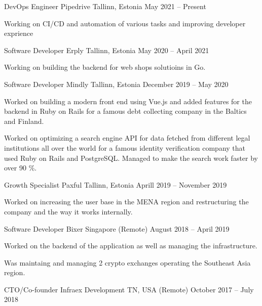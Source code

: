 \documentclass[]{awesome-cv}
\begin{document}
\vspace{-7mm}
\begin{cventries}
        \cventry
       {DevOps Engineer}
        {Pipedrive}
        {Tallinn, Estonia}
        {May 2021 – Present}
        {\begin{cvitems}
                \item {Working on CI/CD and automation of various tasks and improving developer exprience}
                \end{cvitems}}
	\cventry
	{Software Developer}
	{Erply}
	{Tallinn, Estonia}
	{May 2020 – April 2021}
	{\begin{cvitems}
		\item {Working on building the backend for web shops solutioins in Go.}
		\end{cvitems}}
	\cventry
	{Software Developer}
	{Mindly}
	{Tallinn, Estonia}
	{December 2019 – May 2020}
	{\begin{cvitems}
		\item {Worked on building a modern front end using Vue.js and added features for the backend in Ruby on Rails for a famous debt collecting company in the Baltics and Finland.}
		\item {Worked on optimizing a search engine API for data fetched from different legal institutions all over the world for a famous identity verification company that used Ruby on Rails and PostgreSQL. Managed to make the search work faster by over 90 \%.}
		\end{cvitems}}
	\cventry
	{Growth Specialist}
	{Paxful}
	{Tallinn, Estonia}
	{Aprill 2019 – November 2019}
	{\begin{cvitems}
		\item {Worked on increasing the user base in the MENA region and restructuring the company and the way it works internally.}
		\end{cvitems}}
	\cventry
	{Software Developer}
	{Bixer}
	{Singapore (Remote)}
	{August 2018 – April 2019}
	{\begin{cvitems}
		\item {Worked on the backend of the application as well as managing the infrastructure.}
		\item {Was maintaing and managing 2 crypto exchanges operating the Southeast Asia region.}
		\end{cvitems}}
	\cventry
	{CTO/Co-founder}
	{Infraex Development}
	{TN, USA (Remote)}
	{October 2017 – July 2018}

\end{cventries}
\end{document}
